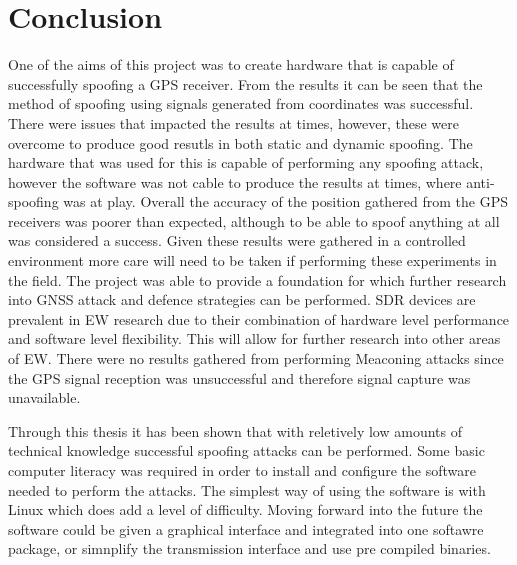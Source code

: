 
\chapter{Conclusion} %

\label{Chapter7} %

One of the aims of this project was to create hardware that is capable of successfully spoofing a GPS receiver. From the results it can be seen that the method of
spoofing using signals generated from coordinates was successful. There were issues that impacted the results at times, however, these were overcome to produce good
resutls in both static and dynamic spoofing. The hardware that was used for this is capable of performing any spoofing attack, however the
software was not cable to produce the results at times, where anti-spoofing was at play.
Overall the accuracy of the position gathered from the GPS receivers was poorer than expected, although
to be able to spoof anything at all was considered a success. Given these results were gathered in a controlled environment more care will need to be taken if
performing these experiments in the field. The project was able to provide a foundation for which further research into GNSS attack and defence strategies can be
performed. SDR devices are prevalent in EW research due to their combination of hardware level performance and software level flexibility. This will allow for further
research into other areas of EW.
There were no results gathered from performing Meaconing attacks since the GPS signal reception was unsuccessful and therefore signal capture was unavailable.

Through this thesis it has been shown that with reletively low amounts of technical knowledge successful spoofing attacks can be performed. Some basic computer literacy
was required in order to install and configure the software needed to perform the attacks. The simplest way of using the software is with Linux which does add a level of
difficulty.
Moving forward into the future the software could be given a graphical interface and integrated into one softawre package, or simnplify the transmission interface and use
pre compiled binaries.